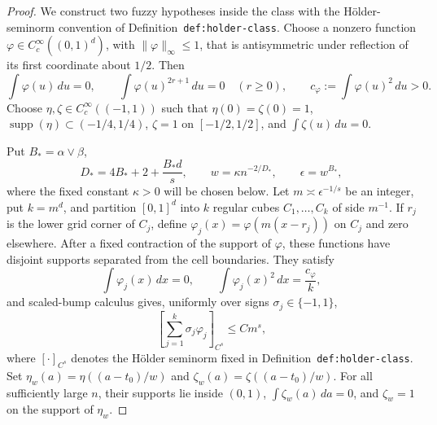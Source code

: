 \documentclass{article}
\begin{document}
\begin{proof}
We construct two fuzzy hypotheses inside the class with the H\"older-seminorm convention of Definition~\texttt{def:holder-class}. Choose a nonzero function \(\varphi\in C_c^\infty((0,1)^d)\), with \(\lVert\varphi\rVert_\infty\le1\), that is antisymmetric under reflection of its first coordinate about \(1/2\). Then
\[
\int\varphi(u)\,du=0,\qquad \int\varphi(u)^{2r+1}\,du=0\quad(r\ge0),\qquad c_\varphi:=\int\varphi(u)^2\,du>0.
\]
Choose \(\eta,\zeta\in C_c^\infty((-1,1))\) such that \(\eta(0)=\zeta(0)=1\), \(\operatorname{supp}(\eta)\subset(-1/4,1/4)\), \(\zeta=1\) on \([-1/2,1/2]\), and \(\int\zeta(u)\,du=0\).

Put \(B_*=\alpha\vee\beta\),
\[
D_*=4B_*+2+\frac{B_*d}{s},\qquad w=\kappa n^{-2/D_*},\qquad \epsilon=w^{B_*},
\]
where the fixed constant \(\kappa>0\) will be chosen below. Let \(m\asymp\epsilon^{-1/s}\) be an integer, put \(k=m^d\), and partition \([0,1]^d\) into \(k\) regular cubes \(C_1,\ldots,C_k\) of side \(m^{-1}\). If \(r_j\) is the lower grid corner of \(C_j\), define \(\varphi_j(x)=\varphi(m(x-r_j))\) on \(C_j\) and zero elsewhere. After a fixed contraction of the support of \(\varphi\), these functions have disjoint supports separated from the cell boundaries. They satisfy
\[
\int\varphi_j(x)\,dx=0,\qquad \int\varphi_j(x)^2\,dx=\frac{c_\varphi}{k},
\]
and scaled-bump calculus gives, uniformly over signs \(\sigma_j\in\{-1,1\}\),
\[
\left[\sum_{j=1}^k\sigma_j\varphi_j\right]_{C^s}\le C m^s,
\]
where \([\cdot]_{C^s}\) denotes the H\"older seminorm fixed in Definition~\texttt{def:holder-class}. Set \(\eta_w(a)=\eta((a-t_0)/w)\) and \(\zeta_w(a)=\zeta((a-t_0)/w)\). For all sufficiently large \(n\), their supports lie inside \((0,1)\), \(\int\zeta_w(a)\,da=0\), and \(\zeta_w=1\) on the support of \(\eta_w\).


\end{proof}
\end{document}
